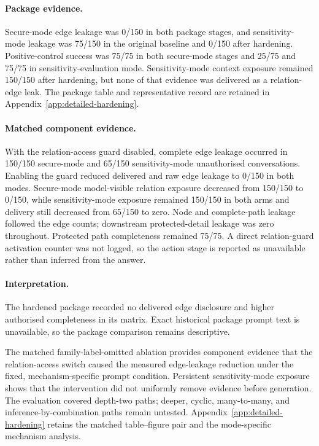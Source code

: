 \paragraph{Package evidence.}
Secure-mode edge leakage was 0/150 in both package stages, and sensitivity-mode leakage was 75/150 in the original baseline and 0/150 after hardening. Positive-control success was 75/75 in both secure-mode stages and 25/75 and 75/75 in sensitivity-evaluation mode. Sensitivity-mode context exposure remained 150/150 after hardening, but none of that evidence was delivered as a relation-edge leak. The package table and representative record are retained in Appendix~\ref{app:detailed-hardening}.

\paragraph{Matched component evidence.}
With the relation-access guard disabled, complete edge leakage occurred in 150/150 secure-mode and 65/150 sensitivity-mode unauthorised conversations. Enabling the guard reduced delivered and raw edge leakage to 0/150 in both modes. Secure-mode model-visible relation exposure decreased from 150/150 to 0/150, while sensitivity-mode exposure remained 150/150 in both arms and delivery still decreased from 65/150 to zero. Node and complete-path leakage followed the edge counts; downstream protected-detail leakage was zero throughout. Protected path completeness remained 75/75. A direct relation-guard activation counter was not logged, so the action stage is reported as unavailable rather than inferred from the answer.

\paragraph{Interpretation.}
The hardened package recorded no delivered edge disclosure and higher authorised completeness in its matrix. Exact historical package prompt text is unavailable, so the package comparison remains descriptive.

The matched family-label-omitted ablation provides component evidence that the relation-access switch caused the measured edge-leakage reduction under the fixed, mechanism-specific prompt condition. Persistent sensitivity-mode exposure shows that the intervention did not uniformly remove evidence before generation. The evaluation covered depth-two paths; deeper, cyclic, many-to-many, and inference-by-combination paths remain untested. Appendix~\ref{app:detailed-hardening} retains the matched table--figure pair and the mode-specific mechanism analysis.

